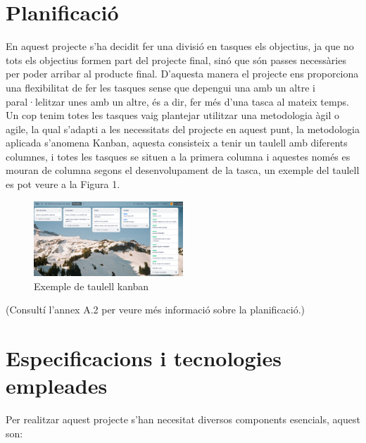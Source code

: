 ﻿\documentclass[10pt,a4paper,twocolumn,twoside]{article}
\begin{document}
\section{Planificació}

En aquest projecte s'ha decidit fer una divisió en tasques els objectius, ja que no tots els objectius formen part del projecte final, sinó que són passes necessàries per poder arribar al producte final. D'aquesta manera el projecte ens proporciona una flexibilitat de fer les tasques sense que depengui una amb un altre i paral·lelitzar unes amb un altre, és a dir, fer més d'una tasca al mateix temps.
\\

Un cop tenim totes les tasques vaig plantejar utilitzar una metodologia àgil o agile, la qual s'adapti a les necessitats del projecte en aquest punt, la metodologia aplicada s'anomena Kanban\cite{Kanban}, aquesta consisteix a tenir un taulell amb diferents columnes, i totes les tasques se situen a la primera columna i aquestes només es mouran de columna segons el desenvolupament de la tasca, un exemple del taulell es pot veure a la Figura 1.

\begin{figure}[h]
\centering
	\includegraphics[width=0.5\textwidth]{img/kanban}
	\caption{Exemple de taulell kanban}
	\label{fig-taulell canban}
\end{figure}

\hfill \break
(Consultí l’annex A.2 per veure més informació sobre la planificació.)

\section{Especificacions i tecnologies empleades }

Per realitzar aquest projecte s'han necesitat diversos components esencials, aquest son:
\end{document}
